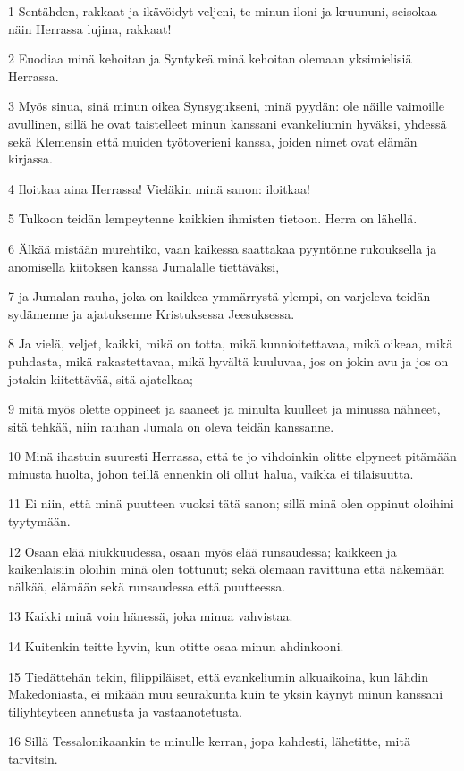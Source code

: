 \par 1 Sentähden, rakkaat ja ikävöidyt veljeni, te minun iloni ja kruununi, seisokaa näin Herrassa lujina, rakkaat!
\par 2 Euodiaa minä kehoitan ja Syntykeä minä kehoitan olemaan yksimielisiä Herrassa.
\par 3 Myös sinua, sinä minun oikea Synsygukseni, minä pyydän: ole näille vaimoille avullinen, sillä he ovat taistelleet minun kanssani evankeliumin hyväksi, yhdessä sekä Klemensin että muiden työtoverieni kanssa, joiden nimet ovat elämän kirjassa.
\par 4 Iloitkaa aina Herrassa! Vieläkin minä sanon: iloitkaa!
\par 5 Tulkoon teidän lempeytenne kaikkien ihmisten tietoon. Herra on lähellä.
\par 6 Älkää mistään murehtiko, vaan kaikessa saattakaa pyyntönne rukouksella ja anomisella kiitoksen kanssa Jumalalle tiettäväksi,
\par 7 ja Jumalan rauha, joka on kaikkea ymmärrystä ylempi, on varjeleva teidän sydämenne ja ajatuksenne Kristuksessa Jeesuksessa.
\par 8 Ja vielä, veljet, kaikki, mikä on totta, mikä kunnioitettavaa, mikä oikeaa, mikä puhdasta, mikä rakastettavaa, mikä hyvältä kuuluvaa, jos on jokin avu ja jos on jotakin kiitettävää, sitä ajatelkaa;
\par 9 mitä myös olette oppineet ja saaneet ja minulta kuulleet ja minussa nähneet, sitä tehkää, niin rauhan Jumala on oleva teidän kanssanne.
\par 10 Minä ihastuin suuresti Herrassa, että te jo vihdoinkin olitte elpyneet pitämään minusta huolta, johon teillä ennenkin oli ollut halua, vaikka ei tilaisuutta.
\par 11 Ei niin, että minä puutteen vuoksi tätä sanon; sillä minä olen oppinut oloihini tyytymään.
\par 12 Osaan elää niukkuudessa, osaan myös elää runsaudessa; kaikkeen ja kaikenlaisiin oloihin minä olen tottunut; sekä olemaan ravittuna että näkemään nälkää, elämään sekä runsaudessa että puutteessa.
\par 13 Kaikki minä voin hänessä, joka minua vahvistaa.
\par 14 Kuitenkin teitte hyvin, kun otitte osaa minun ahdinkooni.
\par 15 Tiedättehän tekin, filippiläiset, että evankeliumin alkuaikoina, kun lähdin Makedoniasta, ei mikään muu seurakunta kuin te yksin käynyt minun kanssani tiliyhteyteen annetusta ja vastaanotetusta.
\par 16 Sillä Tessalonikaankin te minulle kerran, jopa kahdesti, lähetitte, mitä tarvitsin.
